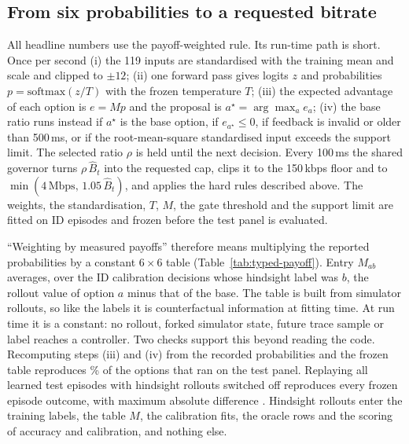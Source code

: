 \documentclass[10pt]{article}
\begin{document}
\subsection{From six probabilities to a requested bitrate}
\label{sec:typed-runtime}
All headline numbers use the payoff-weighted rule. Its run-time path is short. Once per second (i) the 119 inputs are standardised with the training mean and scale and clipped to $\pm12$; (ii) one forward pass gives logits $z$ and probabilities $p=\mathrm{softmax}(z/T)$ with the frozen temperature $T$; (iii) the expected advantage of each option is $e=Mp$ and the proposal is $a^\star=\arg\max_a e_a$; (iv) the base ratio runs instead if $a^\star$ is the base option, if $e_{a^\star}\le 0$, if feedback is invalid or older than 500\,ms, or if the root-mean-square standardised input exceeds the support limit. The selected ratio $\rho$ is held until the next decision. Every 100\,ms the shared governor turns $\rho\,\hat B_t$ into the requested cap, clips it to the 150\,kbps floor and to $\min(4\,\mathrm{Mbps},\,1.05\,\hat B_t)$, and applies the hard rules described above. The weights, the standardisation, $T$, $M$, the gate threshold and the support limit are fitted on ID episodes and frozen before the test panel is evaluated.

``Weighting by measured payoffs'' therefore means multiplying the reported probabilities by a constant $6\times6$ table (Table~\ref{tab:typed-payoff}). Entry $M_{ab}$ averages, over the ID calibration decisions whose hindsight label was $b$, the rollout value of option $a$ minus that of the base. The table is built from simulator rollouts, so like the labels it is counterfactual information at fitting time. At run time it is a constant: no rollout, forked simulator state, future trace sample or label reaches a controller. Two checks support this beyond reading the code. Recomputing steps (iii) and (iv) from the recorded probabilities and the frozen table reproduces \TypedAuditRuleAgreement\% of the options that ran on the test panel. Replaying all \TypedAuditReplayEpisodes{} learned test episodes with hindsight rollouts switched off reproduces every frozen episode outcome, with maximum absolute difference \TypedAuditReplayDifference{}. Hindsight rollouts enter the training labels, the table $M$, the calibration fits, the oracle rows and the scoring of accuracy and calibration, and nothing else.

\begin{table}[t]
\centering\small

\caption{The payoff table $M$ of the proper-score RLCD head, averaged over \TypedModelSeeds{} model seeds: mean rollout advantage over the base ratio of running the row option when the column option turned out best, on ID calibration episodes. The base row is zero by construction.}\label{tab:typed-payoff}
\end{table}
\end{document}
